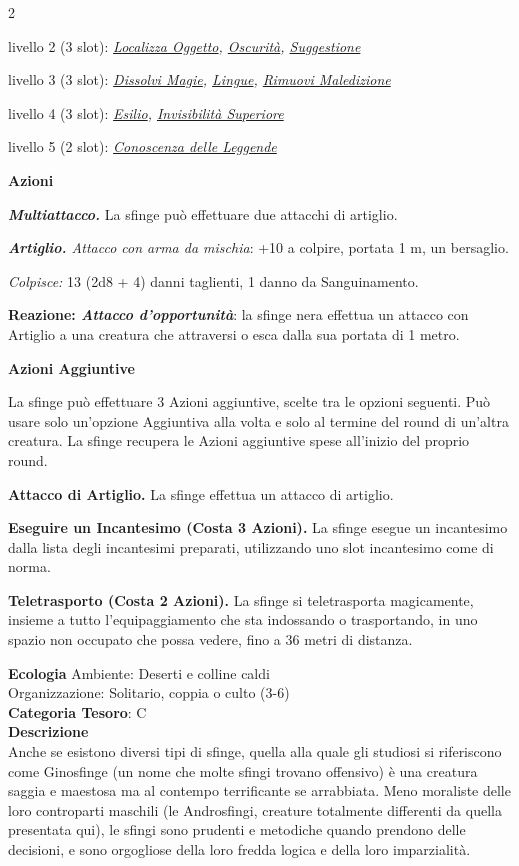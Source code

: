 \begin{multicols}{2}
{livello 2 (3 slot): \emph{\hyperlink{Localizza Oggetto}{Localizza Oggetto}, \hyperlink{Oscurità}{Oscurità}, \hyperlink{Suggestione}{Suggestione}}

livello 3 (3 slot): \emph{\hyperlink{Dissolvi Magie}{Dissolvi Magie}, \hyperlink{Lingue}{Lingue}, \hyperlink{Rimuovi Maledizione}{Rimuovi Maledizione}}

livello 4 (3 slot): \emph{\hyperlink{Esilio}{Esilio}, \hyperlink{Invisibilità Superiore}{Invisibilità Superiore}}

livello 5 (2 slot): \emph{\hyperlink{Conoscenza delle Leggende}{Conoscenza delle Leggende}}

\textbf{Azioni}

\emph{\textbf{Multiattacco.}} La sfinge può effettuare due attacchi di artiglio.

\emph{\textbf{Artiglio.} Attacco con arma da mischia}: +10 a colpire, portata 1 m, un bersaglio.

\emph{Colpisce:} 13 (2d8 + 4) danni taglienti, 1 danno da Sanguinamento.

\textbf{Reazione: \emph{Attacco d'opportunità}}: la sfinge nera effettua un attacco con Artiglio a una creatura che attraversi o esca dalla sua portata di 1 metro.

\textbf{Azioni Aggiuntive}

La sfinge può effettuare 3 Azioni aggiuntive, scelte tra le opzioni seguenti. Può usare solo un'opzione Aggiuntiva alla volta e solo al termine del round di un'altra creatura. La sfinge recupera le Azioni aggiuntive spese all'inizio del proprio round.

\textbf{Attacco di Artiglio.} La sfinge effettua un attacco di artiglio.

\textbf{Eseguire un Incantesimo (Costa 3 Azioni).} La sfinge esegue un incantesimo dalla lista degli incantesimi preparati, utilizzando uno slot incantesimo come di norma.

\textbf{Teletrasporto (Costa 2 Azioni).} La sfinge si teletrasporta magicamente, insieme a tutto l'equipaggiamento che sta indossando o trasportando, in uno spazio non occupato che possa vedere, fino a 36 metri di distanza.

\textbf{Ecologia}
Ambiente: Deserti e colline caldi\\
Organizzazione: Solitario, coppia o culto (3-6)\\
\textbf{Categoria Tesoro}: C\\
\textbf{Descrizione}\\
Anche se esistono diversi tipi di sfinge, quella alla quale gli studiosi si riferiscono come Ginosfinge (un nome che molte sfingi trovano offensivo) è una creatura saggia e maestosa ma al contempo terrificante se arrabbiata. Meno moraliste delle loro controparti maschili (le Androsfingi, creature totalmente differenti da quella presentata qui), le sfingi sono prudenti e metodiche quando prendono delle decisioni, e sono orgogliose della loro fredda logica e della loro imparzialità.

}
\end{multicols}
